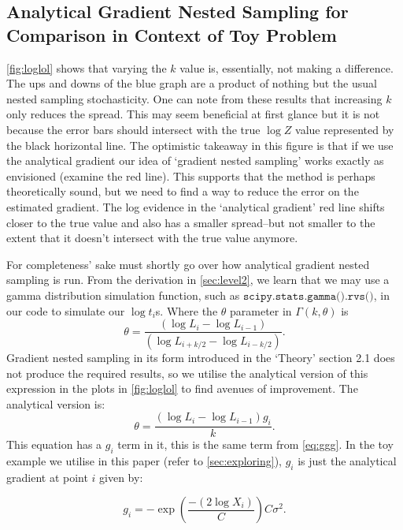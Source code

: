 \subsection{Analytical Gradient Nested Sampling for Comparison in Context of Toy Problem}




\cref{fig:loglol} shows that varying the $k$ value is, essentially, not making a difference. The ups and downs of the blue graph are a product of nothing but the usual nested sampling stochasticity. One can note from these results that increasing $k$ only reduces the spread. This may seem beneficial at first glance but it is not because the error bars should intersect with the true $\log Z$ value represented by the black horizontal line. The optimistic takeaway in this figure is that if we use the analytical gradient our idea of `gradient nested sampling' works exactly as envisioned (examine the red line). This supports that the method is perhaps theoretically sound, but we need to find a way to reduce the error on the estimated gradient. The log evidence in the `analytical gradient' red line shifts closer to the true value and also has a smaller spread--but not smaller to the extent that it doesn't intersect with the true value anymore.


For completeness' sake must shortly go over how analytical gradient nested sampling is run. From the derivation in \cref{sec:level2}, we learn that we may use a gamma distribution simulation function, such as $\texttt{scipy.stats.gamma().rvs()}$, in our code to simulate our $\log t_i$s. Where the $\theta$ parameter in $\Gamma (k,\theta)$ is 
%
\begin{equation}
   \theta = \frac{(\log L_i-\log L_{i-1})}{(\log L_{i+k/2}-\log L_{i-k/2})}.
\label{eq:t1}
\end{equation}
%
Gradient nested sampling in its form introduced in the `Theory' section 2.1 does not produce the required results, so we utilise the analytical version of this expression in the plots in \cref{fig:loglol} to find avenues of improvement. The analytical version is:
%
\begin{equation}
   \theta = \frac{(\log L_i-\log L_{i-1})g_i}{k}.
\label{eq:t2}
\end{equation}
%
This equation has a $g_i$ term in it, this is the same term from \cref{eq:ggg}. In the toy example we utilise in this paper (refer to \cref{sec:exploring}), $g_i$ is just the analytical gradient at point $i$ given by:

\begin{equation}
    g_i = - \exp(\frac{-(2 \log X_i)}{C})C \sigma^2.
\label{eq:nest}
\end{equation}


